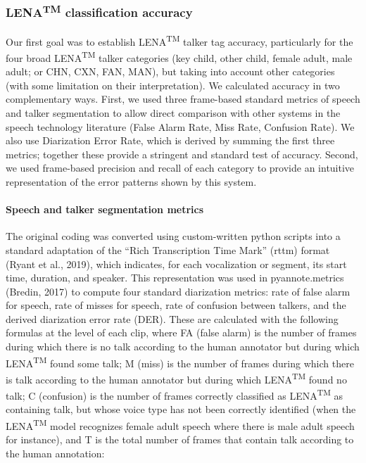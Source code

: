 \documentclass[english,table,man,floatsintext]{apa6}
\let\oldparagraph\paragraph
\renewcommand{\paragraph}[1]{\oldparagraph{#1}\mbox{}}
\begin{document}
\hypertarget{lenatm-classification-accuracy}{%
\subsubsection{\texorpdfstring{LENA\textsuperscript{TM} classification accuracy}{LENATM classification accuracy}}\label{lenatm-classification-accuracy}}

Our first goal was to establish LENA\textsuperscript{TM} talker tag accuracy, particularly for the four broad LENA\textsuperscript{TM} talker categories (key child, other child, female adult, male adult; or CHN, CXN, FAN, MAN), but taking into account other categories (with some limitation on their interpretation). We calculated accuracy in two complementary ways. First, we used three frame-based standard metrics of speech and talker segmentation to allow direct comparison with other systems in the speech technology literature (False Alarm Rate, Miss Rate, Confusion Rate). We also use Diarization Error Rate, which is derived by summing the first three metrics; together these provide a stringent and standard test of accuracy. Second, we used frame-based precision and recall of each category to provide an intuitive representation of the error patterns shown by this system.

\hypertarget{speech-and-talker-segmentation-metrics}{%
\paragraph{Speech and talker segmentation metrics}\label{speech-and-talker-segmentation-metrics}}

The original coding was converted using custom-written python scripts into a standard adaptation of the \enquote{Rich Transcription Time Mark} (rttm) format (Ryant et al., 2019), which indicates, for each vocalization or segment, its start time, duration, and speaker. This representation was used in pyannote.metrics (Bredin, 2017) to compute four standard diarization metrics: rate of false alarm for speech, rate of misses for speech, rate of confusion between talkers, and the derived diarization error rate (DER). These are calculated with the following formulas at the level of each clip, where FA (false alarm) is the number of frames during which there is no talk according to the human annotator but during which LENA\textsuperscript{TM} found some talk; M (miss) is the number of frames during which there is talk according to the human annotator but during which LENA\textsuperscript{TM} found no talk; C (confusion) is the number of frames correctly classified as LENA\textsuperscript{TM} as containing talk, but whose voice type has not been correctly identified (when the LENA\textsuperscript{TM} model recognizes female adult speech where there is male adult speech for instance), and T is the total number of frames that contain talk according to the human annotation:
\end{document}
